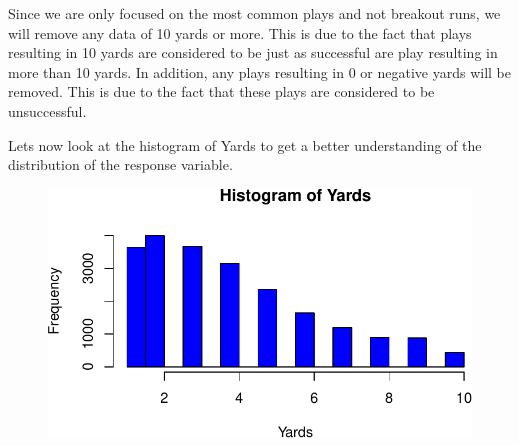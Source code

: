 \documentclass[
  super,
  preprint,
  3p]{elsarticle}
\newenvironment{Shaded}{\begin{snugshade}}{\end{snugshade}}
\newcommand{\AttributeTok}[1]{\textcolor[rgb]{0.40,0.45,0.13}{#1}}
\newcommand{\CommentTok}[1]{\textcolor[rgb]{0.37,0.37,0.37}{#1}}
\newcommand{\DecValTok}[1]{\textcolor[rgb]{0.68,0.00,0.00}{#1}}
\newcommand{\FunctionTok}[1]{\textcolor[rgb]{0.28,0.35,0.67}{#1}}
\newcommand{\NormalTok}[1]{\textcolor[rgb]{0.00,0.23,0.31}{#1}}
\newcommand{\OtherTok}[1]{\textcolor[rgb]{0.00,0.23,0.31}{#1}}
\newcommand{\SpecialCharTok}[1]{\textcolor[rgb]{0.37,0.37,0.37}{#1}}
\newcommand{\StringTok}[1]{\textcolor[rgb]{0.13,0.47,0.30}{#1}}
\begin{document}
Since we are only focused on the most common plays and not breakout
runs, we will remove any data of 10 yards or more. This is due to the
fact that plays resulting in 10 yards are considered to be just as
successful are play resulting in more than 10 yards. In addition, any
plays resulting in 0 or negative yards will be removed. This is due to
the fact that these plays are considered to be unsuccessful.

\begin{Shaded}
\end{Shaded}

Lets now look at the histogram of Yards to get a better understanding of
the distribution of the response variable.

\begin{Shaded}
\end{Shaded}

\begin{figure}[H]

{\centering \includegraphics{project_report_files/figure-pdf/unnamed-chunk-19-1.pdf}

}

\end{figure}
\end{document}
